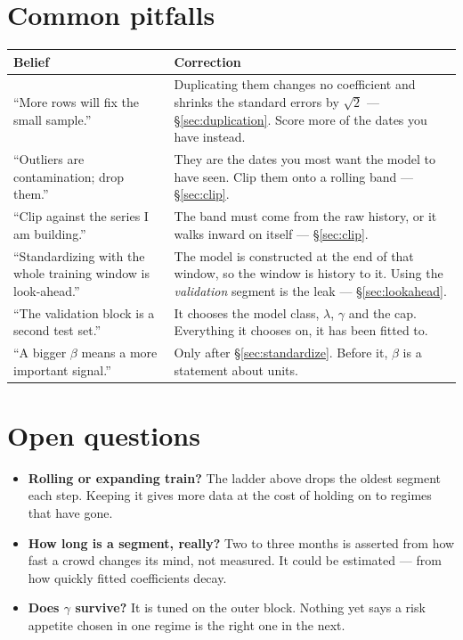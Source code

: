 \documentclass[11pt]{article}
\theoremstyle{runin}
\begin{document}
\section*{Common pitfalls}

\begin{center}
\begin{tabularx}{\linewidth}{@{}L{5.2cm}X@{}}
\toprule
\textbf{Belief} & \textbf{Correction} \\
\midrule
``More rows will fix the small sample.''
& Duplicating them changes no coefficient and shrinks the standard errors by $\sqrt{2}$ ---
\S\ref{sec:duplication}. Score more of the dates you have instead. \\
\addlinespace
``Outliers are contamination; drop them.''
& They are the dates you most want the model to have seen. Clip them onto a rolling band ---
\S\ref{sec:clip}. \\
\addlinespace
``Clip against the series I am building.''
& The band must come from the raw history, or it walks inward on itself --- \S\ref{sec:clip}. \\
\addlinespace
``Standardizing with the whole training window is look-ahead.''
& The model is constructed at the end of that window, so the window is history to it. Using the
\emph{validation} segment is the leak --- \S\ref{sec:lookahead}. \\
\addlinespace
``The validation block is a second test set.''
& It chooses the model class, $\lambda$, $\gamma$ and the cap. Everything it chooses on, it has
been fitted to. \\
\addlinespace
``A bigger $\beta$ means a more important signal.''
& Only after \S\ref{sec:standardize}. Before it, $\beta$ is a statement about units. \\
\bottomrule
\end{tabularx}
\end{center}

\section*{Open questions}

\begin{itemize}
  \item \textbf{Rolling or expanding train?} The ladder above drops the oldest segment each step.
    Keeping it gives more data at the cost of holding on to regimes that have gone.
  \item \textbf{How long is a segment, really?} Two to three months is asserted from how fast a
    crowd changes its mind, not measured. It could be estimated --- from how quickly fitted
    coefficients decay.
  \item \textbf{Does $\gamma$ survive?} It is tuned on the outer block. Nothing yet says a risk
    appetite chosen in one regime is the right one in the next.
\end{itemize}
\end{document}
